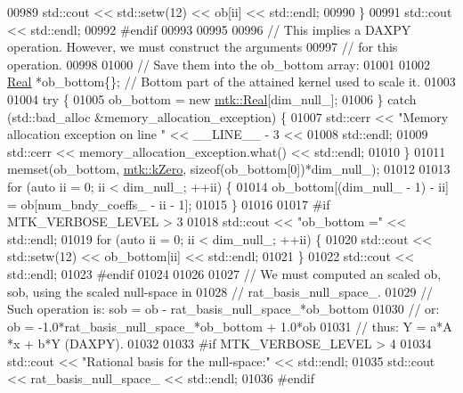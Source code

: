 \begin{DoxyCode}
{{00989       std::cout << std::setw(12) << ob[ii] << std::endl;
00990     \}
00991     std::cout << std::endl;
00992 \textcolor{preprocessor}{    #endif}
00993 
00995 
00996     \textcolor{comment}{// This implies a DAXPY operation. However, we must construct the arguments}
00997     \textcolor{comment}{// for this operation.}
00998 
01000     \textcolor{comment}{// Save them into the ob\_bottom array:}
01001 
01002     \hyperlink{group__c01-roots_gac080bbbf5cbb5502c9f00405f894857d}{Real} *ob\_bottom\{\}; \textcolor{comment}{// Bottom part of the attained kernel used to scale it.}
01003 
01004     \textcolor{keywordflow}{try} \{
01005       ob\_bottom = \textcolor{keyword}{new} \hyperlink{group__c01-roots_gac080bbbf5cbb5502c9f00405f894857d}{mtk::Real}[dim\_null\_];
01006     \} \textcolor{keywordflow}{catch} (std::bad\_alloc &memory\_allocation\_exception) \{
01007       std::cerr << \textcolor{stringliteral}{"Memory allocation exception on line "} << \_\_LINE\_\_ - 3 <<
01008         std::endl;
01009       std::cerr << memory\_allocation\_exception.what() << std::endl;
01010     \}
01011     memset(ob\_bottom, \hyperlink{group__c01-roots_ga59a451a5fae30d59649bcda274fea271}{mtk::kZero}, \textcolor{keyword}{sizeof}(ob\_bottom[0])*dim\_null\_);
01012 
01013     \textcolor{keywordflow}{for} (\textcolor{keyword}{auto} ii = 0; ii < dim\_null\_; ++ii) \{
01014       ob\_bottom[(dim\_null\_ - 1) - ii] = ob[num\_bndy\_coeffs\_ - ii - 1];
01015     \}
01016 
01017 \textcolor{preprocessor}{    #if MTK\_VERBOSE\_LEVEL > 3}
01018     std::cout << \textcolor{stringliteral}{"ob\_bottom ="} << std::endl;
01019     \textcolor{keywordflow}{for} (\textcolor{keyword}{auto} ii = 0; ii < dim\_null\_; ++ii) \{
01020       std::cout << std::setw(12) << ob\_bottom[ii] << std::endl;
01021     \}
01022     std::cout << std::endl;
01023 \textcolor{preprocessor}{    #endif}
01024 
01026 
01027     \textcolor{comment}{// We must computed an scaled ob, sob, using the scaled null-space in}
01028     \textcolor{comment}{// rat\_basis\_null\_space\_.}
01029     \textcolor{comment}{// Such operation is: sob = ob - rat\_basis\_null\_space\_*ob\_bottom}
01030     \textcolor{comment}{// or:                 ob = -1.0*rat\_basis\_null\_space\_*ob\_bottom + 1.0*ob}
01031     \textcolor{comment}{// thus:                Y =    a*A    *x         +   b*Y (DAXPY).}
01032 
01033 \textcolor{preprocessor}{    #if MTK\_VERBOSE\_LEVEL > 4}
01034     std::cout << \textcolor{stringliteral}{"Rational basis for the null-space:"} << std::endl;
01035     std::cout << rat\_basis\_null\_space\_ << std::endl;
01036 \textcolor{preprocessor}{    #endif}
}}
\end{DoxyCode}
